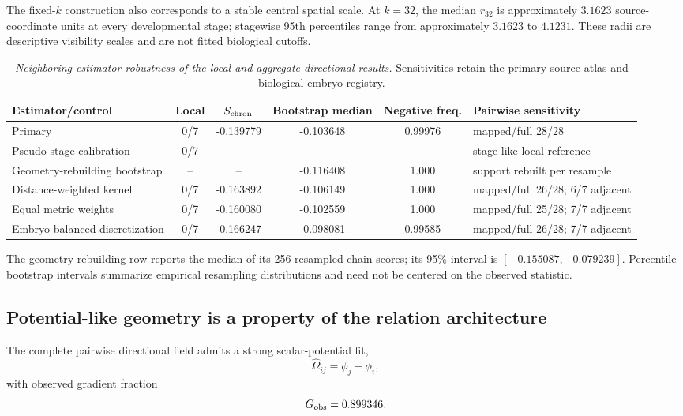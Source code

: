 \documentclass[11pt]{article}
\begin{document}
The fixed-$k$ construction also corresponds to a stable central spatial scale. At $k=32$, the median $r_{32}$ is approximately $3.1623$ source-coordinate units at every developmental stage; stagewise 95th percentiles range from approximately $3.1623$ to $4.1231$. These radii are descriptive visibility scales and are not fitted biological cutoffs.

\begin{table}[!htbp]
\centering
\scriptsize
\caption{\textit{Neighboring-estimator robustness of the local and aggregate directional results.} Sensitivities retain the primary source atlas and biological-embryo registry.}
\label{tab:methods_robustness}
\begin{tabular}{p{}cccc p{}}
\toprule
Estimator/control & Local & $S_{\rm chron}$ & Bootstrap median & Negative freq. & Pairwise sensitivity\\
\midrule
Primary & 0/7 & -0.139779 & -0.103648 & 0.99976 & mapped/full 28/28\\
Pseudo-stage calibration & 0/7 & -- & -- & -- & stage-like local reference\\
Geometry-rebuilding bootstrap & -- & -- & -0.116408 & 1.000 & support rebuilt per resample\\
Distance-weighted kernel & 0/7 & -0.163892 & -0.106149 & 1.000 & mapped/full 26/28; 6/7 adjacent\\
Equal metric weights & 0/7 & -0.160080 & -0.102559 & 1.000 & mapped/full 25/28; 7/7 adjacent\\
Embryo-balanced discretization & 0/7 & -0.166247 & -0.098081 & 0.99585 & mapped/full 26/28; 7/7 adjacent\\
\bottomrule
\end{tabular}

\vspace{0.35em}
{\footnotesize The geometry-rebuilding row reports the median of its 256 resampled chain scores; its 95\% interval is $[-0.155087,-0.079239]$. Percentile bootstrap intervals summarize empirical resampling distributions and need not be centered on the observed statistic.}
\end{table}
\FloatBarrier

\newpage
\subsection{Potential-like geometry is a property of the relation architecture}

The complete pairwise directional field admits a strong scalar-potential fit,
\[
\widehat\Omega_{ij}=\phi_j-\phi_i,
\]
with observed gradient fraction
\[
G_{\rm obs}=0.899346.
\]
\end{document}
